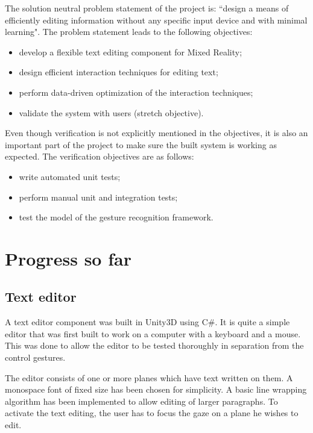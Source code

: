 \documentclass[a4paper, 12pt]{article}
\begin{document}
The solution neutral problem statement of the project is: ``design a means of efficiently editing information without any specific input device and with minimal learning". The problem statement leads to the following objectives:
\vspace{-0.2cm}
\begin{itemize}
	\setlength\itemsep{0em}
	\item develop a flexible text editing component for Mixed Reality;
	\item design efficient interaction techniques for editing text;
	\item perform data-driven optimization of the interaction techniques;
	\item validate the system with users (stretch objective).
\end{itemize}

Even though verification is not explicitly mentioned in the objectives, it is also an important part of the project to make sure the built system is working as expected. The verification objectives are as follows:
\vspace{-0.2cm}
\begin{itemize}
	\setlength\itemsep{0em}
	\item write automated unit tests;
	\item perform manual unit and integration tests;
	\item test the model of the gesture recognition framework.
\end{itemize}

\section{Progress so far}

\subsection{Text editor}

A text editor component was built in Unity3D using C\#. It is quite a simple editor that was first built to work on a computer with a keyboard and a mouse. This was done to allow the editor to be tested thoroughly in separation from the control gestures. 

The editor consists of one or more planes which have text written on them. A monospace font of fixed size has been chosen for simplicity. A basic line wrapping algorithm has been implemented to allow editing of larger paragraphs. To activate the text editing, the user has to focus the gaze on a plane he wishes to edit. 
\end{document}
